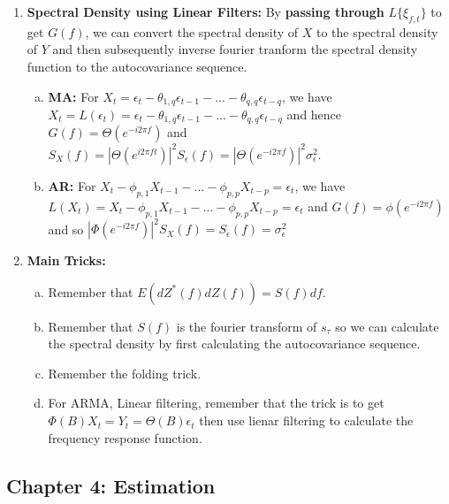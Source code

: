 \documentclass{article}
\begin{document}
\begin{enumerate}
    \item \textbf{Spectral Density using Linear Filters:} By \textbf{passing through} \(L\{\xi_{f,t}\}\) to get \(G(f)\), we can convert the spectral density of \(X\) to the spectral density of \(Y\) and then subsequently inverse fourier tranform the spectral density function to the autocovariance sequence.
    \begin{enumerate} [a.] 
        \item \textbf{MA:} For \(X_t  = \epsilon_t - \theta_{1,q}\epsilon_{t-1} - ... - \theta_{q,q}\epsilon_{t-q}\), we have \(X_t = L(\epsilon_t) = \epsilon_t - \theta_{1,q}\epsilon_{t-1} - ... - \theta_{q,q}\epsilon_{t-q}\) and hence \(G(f) = \Theta(e^{-i 2 \pi f}) \) and \(S_X(f) = |\Theta(e^{i 2 \pi ft})|^2S_\epsilon(f) = |\Theta(e^{-i 2 \pi f})|^2\sigma_\epsilon^2\).
        \item \textbf{AR:} For \(X_t - \phi_{p,1}X_{t-1}- ...- \phi_{p,p}X_{t-p} = \epsilon_t\), we have \(L(X_t) = X_t - \phi_{p,1}X_{t-1}- ...- \phi_{p,p}X_{t-p} = \epsilon_t\) and \(G(f) = \phi(e^{-i 2 \pi f})\) and so \(|\Phi(e^{-i 2 \pi f})|^2 S_X(f) = S_\epsilon(f) = \sigma_\epsilon^2\)
    \end{enumerate}

    \item \textbf{Main Tricks:}
    \begin{enumerate} [a.]
        \item Remember that \(E(dZ^*(f)dZ(f)) = S(f)df\).
        \item Remember that \(S(f)\) is the fourier transform of \(s_\tau\) so we can calculate the spectral density by first calculating the autocovariance sequence.
        \item Remember the folding trick.
        \item For ARMA, Linear filtering, remember that the trick is to get \(\Phi(B)X_t = Y_t = \Theta(B)\epsilon_t\) then use lienar filtering to calculate the frequency response function.
    \end{enumerate}

\end{enumerate}
\subsection*{Chapter 4: Estimation}
\end{document}
